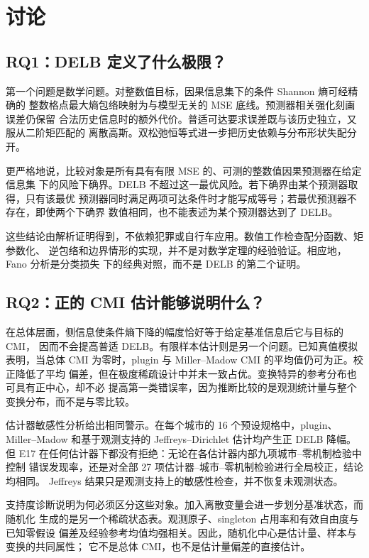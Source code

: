 \section{讨论}
\label{sec:discussion}

\subsection{RQ1：DELB 定义了什么极限？}
\label{subsec:discussion_rq1}

第一个问题是数学问题。对整数值目标，因果信息集下的条件 Shannon 熵可经精确的
整数格点最大熵包络映射为与模型无关的 MSE 底线。预测器相关强化刻画误差仍保留
合法历史信息时的额外代价。普适可达要求误差既与该历史独立，又服从二阶矩匹配的
离散高斯。双松弛恒等式进一步把历史依赖与分布形状失配分开。

更严格地说，比较对象是所有具有有限 MSE 的、可测的整数值因果预测器在给定信息集
下的风险下确界。DELB 不超过这一最优风险。若下确界由某个预测器取得，只有该最优
预测器同时满足两项可达条件时才能写成等号；若最优预测器不存在，即使两个下确界
数值相同，也不能表述为某个预测器达到了 DELB。

这些结论由解析证明得到，不依赖犯罪或自行车应用。数值工作检查配分函数、矩参数化、
逆包络和边界情形的实现，并不是对数学定理的经验验证。相应地，Fano 分析是分类损失
下的经典对照，而不是 DELB 的第二个证明。

\subsection{RQ2：正的 CMI 估计能够说明什么？}
\label{subsec:discussion_rq2}

在总体层面，侧信息使条件熵下降的幅度恰好等于给定基准信息后它与目标的 CMI，
因而不会提高普适 DELB。有限样本估计则是另一个问题。已知真值模拟表明，当总体
CMI 为零时，plugin 与 Miller--Madow CMI 的平均值仍可为正。校正降低了平均
偏差，但在极度稀疏设计中并未一致占优。变换特异的参考分布也可具有正中心，却不必
提高第一类错误率，因为推断比较的是观测统计量与整个变换分布，而不是与零比较。

估计器敏感性分析给出相同警示。在每个城市的 16 个预设规格中，plugin、
Miller--Madow 和基于观测支持的 Jeffreys--Dirichlet 估计均产生正 DELB 降幅。
但 E17 在任何估计器下都没有拒绝：无论在各估计器内部九项城市--零机制检验中控制
错误发现率，还是对全部 27 项估计器--城市--零机制检验进行全局校正，结论均相同。
Jeffreys 结果只是观测支持上的敏感性检查，并不恢复未观测状态。

支持度诊断说明为何必须区分这些对象。加入离散变量会进一步划分基准状态，而随机化
生成的是另一个稀疏状态表。观测原子、singleton 占用率和有效自由度与已知零假设
偏差及经验参考均值均强相关。因此，随机化中心是估计量、样本与变换的共同属性；
它不是总体 CMI，也不是估计量偏差的直接估计。

